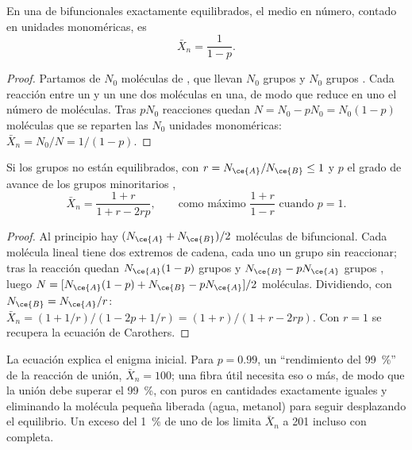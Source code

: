 \begin{theorem}\label{thm:b2:polymer-synthesis:carothers}
En una  de  bifuncionales exactamente equilibrados, el  medio en
número, contado en unidades monoméricas, es
\begin{equation*}
\bar X_n = \frac{1}{1 - p}.
\end{equation*}
\end{theorem}

\begin{proof}
Partamos de $N_0$ moléculas de , que llevan $N_0$ grupos  y $N_0$ grupos . Cada reacción
entre un  y un  une dos moléculas en una, de modo que reduce en uno el número de moléculas.
Tras $pN_0$ reacciones quedan $N = N_0 - pN_0 = N_0(1-p)$ moléculas que se reparten las $N_0$ unidades
monoméricas: $\bar X_n = N_0/N = 1/(1-p)$.
\end{proof}

\begin{corollary}[Desequilibrio]\label{cor:b2:polymer-synthesis:imbalance}
Si los grupos no están equilibrados, con $r = N_{\ce{A}}/N_{\ce{B}} \le 1$ y $p$ el grado de avance de
los grupos minoritarios ,
\begin{equation*}
\bar X_n = \frac{1 + r}{1 + r - 2rp}, \qquad \text{como máximo } \frac{1+r}{1-r} \text{ cuando } p = 1.
\end{equation*}
\end{corollary}

\begin{proof}
Al principio hay $(N_{\ce{A}} + N_{\ce{B}})/2$ moléculas de  bifuncional. Cada molécula
lineal tiene dos extremos de cadena, cada uno un grupo sin reaccionar; tras la reacción quedan $N_{\ce{A}}(1-p)$
grupos  y $N_{\ce{B}} - pN_{\ce{A}}$ grupos , luego $N = [N_{\ce{A}}(1-p) + N_{\ce{B}} -
pN_{\ce{A}}]/2$ moléculas. Dividiendo, con $N_{\ce{B}} = N_{\ce{A}}/r$:
$\bar X_n = (1 + 1/r)/(1 - 2p + 1/r) = (1+r)/(1 + r - 2rp)$. Con $r = 1$ se recupera la ecuación de Carothers.
\end{proof}

La ecuación explica el enigma inicial. Para $p = 0.99$, un ``rendimiento del 99~\%'' de la reacción de unión, $\bar X_n =
100$; una fibra útil necesita eso o más, de modo que la unión debe superar el 99~\%, con  puros
en cantidades exactamente iguales y eliminando la molécula pequeña liberada (agua, metanol) para seguir desplazando el
equilibrio. Un exceso del 1~\% de uno de los  limita $\bar X_n$ a 201 incluso con  completa.

